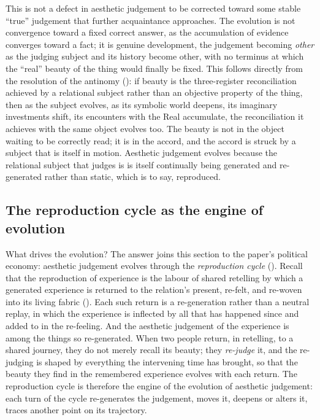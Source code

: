 This is not a defect in aesthetic judgement to be corrected toward some stable ``true'' judgement that further acquaintance approaches. The evolution is not convergence toward a fixed correct answer, as the accumulation of evidence converges toward a fact; it is genuine development, the judgement becoming \emph{other} as the judging subject and its history become other, with no terminus at which the ``real'' beauty of the thing would finally be fixed. This follows directly from the resolution of the antinomy (): if beauty is the three-register reconciliation achieved by a relational subject rather than an objective property of the thing, then as the subject evolves, as its symbolic world deepens, its imaginary investments shift, its encounters with the Real accumulate, the reconciliation it achieves with the same object evolves too. The beauty is not in the object waiting to be correctly read; it is in the accord, and the accord is struck by a subject that is itself in motion. Aesthetic judgement evolves because the relational subject that judges is is itself continually being generated and re-generated rather than static, which is to say, reproduced.

\subsection{The reproduction cycle as the engine of evolution}
\label{p21:sub:ev-reproduction}

What drives the evolution? The answer joins this section to the paper's political economy: aesthetic judgement evolves through the \emph{reproduction cycle} (). Recall that the reproduction of experience is the labour of shared retelling by which a generated experience is returned to the relation's present, re-felt, and re-woven into its living fabric (). Each such return is a re-generation rather than a neutral replay, in which the experience is inflected by all that has happened since and added to in the re-feeling. And the aesthetic judgement of the experience is among the things so re-generated. When two people return, in retelling, to a shared journey, they do not merely recall its beauty; they \emph{re-judge} it, and the re-judging is shaped by everything the intervening time has brought, so that the beauty they find in the remembered experience evolves with each return. The reproduction cycle is therefore the engine of the evolution of aesthetic judgement: each turn of the cycle re-generates the judgement, moves it, deepens or alters it, traces another point on its trajectory.

